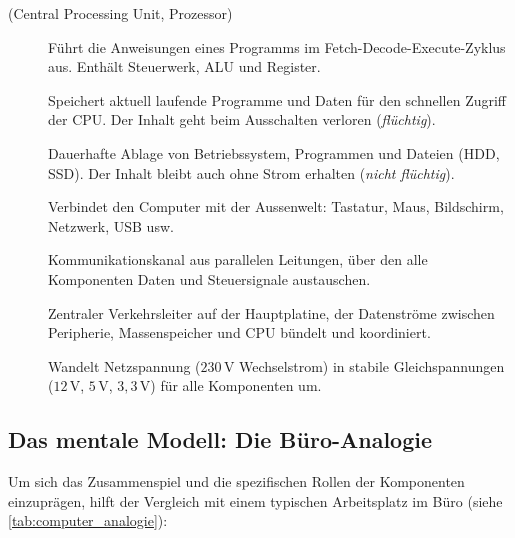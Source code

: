 \begin{description}
    \item[ (Central Processing Unit, Prozessor)] Führt die Anweisungen eines Programms im Fetch-Decode-Execute-Zyklus aus. Enthält Steuerwerk, \gls{ALU} und Register.
    \item[] Speichert aktuell laufende Programme und Daten für den schnellen Zugriff der \gls{CPU}. Der Inhalt geht beim Ausschalten verloren (\emph{flüchtig}).
    \item[] Dauerhafte Ablage von Betriebssystem, Programmen und Dateien (\gls{HDD}, \gls{SSD}). Der Inhalt bleibt auch ohne Strom erhalten (\emph{nicht flüchtig}).
    \item[] Verbindet den Computer mit der Aussenwelt: Tastatur, Maus, Bildschirm, Netzwerk, \gls{USB} usw.
    \item[] Kommunikationskanal aus parallelen Leitungen, über den alle Komponenten Daten und Steuersignale austauschen.
    \item[] Zentraler Verkehrsleiter auf der Hauptplatine, der Datenströme zwischen Peripherie, Massenspeicher und \gls{CPU} bündelt und koordiniert.
    \item[] Wandelt Netzspannung ($230\,\mathrm{V}$ Wechselstrom) in stabile Gleichspannungen ($12\,\mathrm{V}$, $5\,\mathrm{V}$, $3{,}3\,\mathrm{V}$) für alle Komponenten um.
\end{description}

\subsection{Das mentale Modell: Die Büro-Analogie}

Um sich das Zusammenspiel und die spezifischen Rollen der Komponenten einzuprägen, hilft der Vergleich mit einem typischen Arbeitsplatz im Büro (siehe \cref{tab:computer_analogie}):

